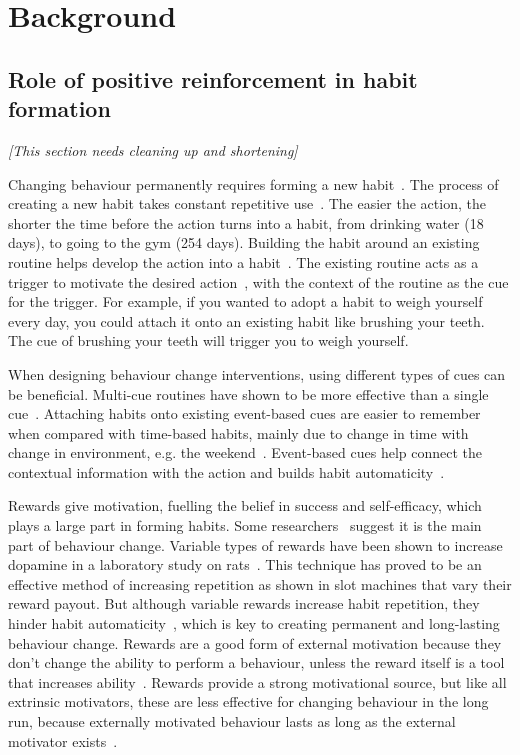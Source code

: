 \documentclass{scaffold/sigchi}
\begin{document}
\section{Background}
\subsection{Role of positive reinforcement in habit formation}
\emph{[This section needs cleaning up and shortening]}

Changing behaviour permanently requires forming a new habit~\cite{article_experiences_of_habit_formation}. The process of creating a new habit takes constant repetitive use~\cite{article_how_habits_formed_modelling_habit_formation}. The easier the action, the shorter the time before the action turns into a habit, from drinking water (18 days), to going to the gym (254 days). Building the habit around an existing routine helps develop the action into a habit~\cite{habits_event_cues_1}. The existing routine acts as a trigger to motivate the desired action~\cite{habits_event_cues_2}, with the context of the routine as the cue for the trigger. For example, if you wanted to adopt a habit to weigh yourself every day, you could attach it onto an existing habit like brushing your teeth. The cue of brushing your teeth will trigger you to weigh yourself.


When designing behaviour change interventions, using different types of cues can be beneficial. Multi-cue routines have shown to be more effective than a single cue~\cite{article_understanding_use_contextual_cues_design_impl}. Attaching habits onto existing event-based cues are easier to remember~\cite{article_implementation_intentions_multicue} when compared with time-based habits, mainly due to change in time with change in environment, e.g. the weekend~\cite{coaching_not_that_good}. Event-based cues help connect the contextual information with the action and builds habit automaticity~\cite{article_implementation_intentions}.
 
Rewards give motivation, fuelling the belief in success and self-efficacy, which plays a large part in forming habits. Some researchers~\cite{article_a_self_efficacy} suggest it is the main part of behaviour change. Variable types of rewards have been shown to increase dopamine in a laboratory study on rats~\cite{variable_rewards_increases_dopamine}. This technique has proved to be an effective method of increasing repetition as shown in slot machines that vary their reward payout. But although variable rewards increase habit repetition, they hinder habit automaticity~\cite{variable_rewards_increases_dopamine}, which is key to creating permanent and long-lasting behaviour change. Rewards are a good form of external motivation because they don't change the ability to perform a behaviour, unless the reward itself is a tool that increases ability~\cite{article_taxonomy_motivational_affordances_meaningful}. Rewards provide a strong motivational source, but like all extrinsic motivators, these are less effective for changing behaviour in the long run, because externally motivated behaviour lasts as long as the external motivator exists~\cite{article_beyond_self_tracking_designing_apps}.
\end{document}
